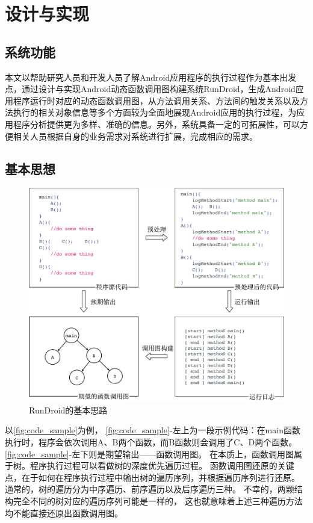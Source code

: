 \chapter{设计与实现 }
\label{ch3}

\section{系统功能}
本文以帮助研究人员和开发人员了解Android应用程序的执行过程作为基本出发点，通过设计与实现Android动态函数调用图构建系统RunDroid，生成Android应用程序运行时对应的动态函数调用图，从方法调用关系、方法间的触发关系以及方法执行的相关对象信息等多个方面较为全面地展现Android应用的执行过程，为应用程序分析提供更为多样、准确的信息。另外，系统具备一定的可拓展性，可以方便相关人员根据自身的业务需求对系统进行扩展，完成相应的需求。

\section{基本思想}



\begin{figure}[ht]
	\centering
	\includegraphics[width=\textwidth]{./Figures/code-sample.png}
	\caption{RunDroid的基本思路}
	\label{fig:code_sample}
\end{figure}


以\autoref{fig:code_sample}为例，%
\autoref{fig:code_sample}-左上为一段示例代码：在main函数执行时，程序会依次调用A、B两个函数，而B函数则会调用了C、D两个函数。
\autoref{fig:code_sample}-左下则是期望输出——函数调用图。
在本质上，函数调用图属于树。程序执行过程可以看做树的深度优先遍历过程。
函数调用图还原的关键点，在于如何在程序执行过程中输出树的遍历序列，并根据遍历序列进行还原。
通常的，树的遍历分为中序遍历、前序遍历以及后序遍历三种。
不幸的，两颗结构完全不同的树对应的遍历序列可能是一样的，
这也就意味着上述三种遍历方法均不能直接还原出函数调用图。

